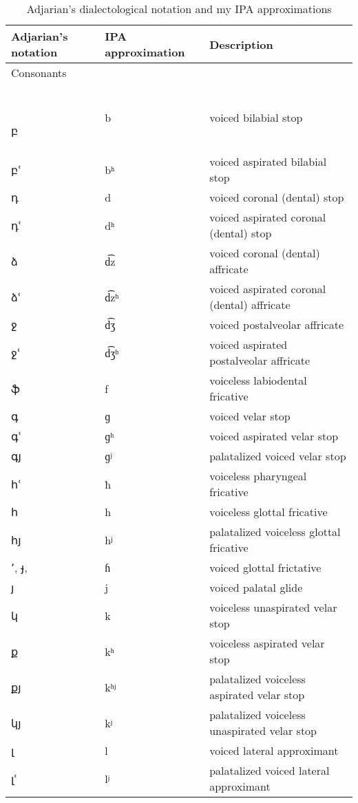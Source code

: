\begin{center}
	\begin{longtable}{|lll|}

		\caption{Adjarian's  dialectological notation and my IPA approximations } \label{tab:adjIPA} \\ \hline
		\hline Adjarian's notation & IPA approximation & Description \\
		\hline 
		\multicolumn{3}{|l|}{Consonants}					\\\

բ	& 	b 	& 	voiced bilabial stop	\\
		բՙ	& 	bʰ	& 	voiced aspirated bilabial stop	\\
		դ	& 	d 	& 	voiced coronal (dental) stop	\\
		դՙ	& 	dʰ	& 	voiced aspirated coronal (dental) stop	\\
		ձ	& 	d͡z 	& 	voiced coronal (dental) affricate	\\
		ձՙ	& 	d͡zʰ	& 	voiced aspirated coronal (dental) affricate	\\
		ջ	& 	d͡ʒ	& 	voiced postalveolar affricate	\\
		ջՙ	& 	d͡ʒʰ	& 	voiced aspirated postalveolar affricate	\\
		ֆ	& 	f	& 	voiceless labiodental fricative	\\
		գ	& 	ɡ 	& 	voiced velar stop	\\
		գՙ	& 	ɡʰ	& 	voiced aspirated velar stop	\\
		գյ	& 	ɡʲ	& 	palatalized voiced velar stop	\\
		հՙ	& 	ħ	& 	 voiceless pharyngeal fricative	\\
		հ	& 	h 	& 	voiceless glottal fricative	\\
		հյ	& 	hʲ	& 	palatalized voiceless glottal fricative	\\
		՚, յ̵,   \armeniang{ֈ}	& 	ɦ	& 	voiced glottal frictative	\\
		յ	& 	j	& 	voiced palatal glide	\\
		կ	& 	k 	& 	voiceless unaspirated velar stop	\\
		ք	& 	kʰ	& 	voiceless aspirated velar stop	\\
		քյ	& 	kʰʲ	& 	palatalized voiceless aspirated velar stop	\\
		կյ	& 	kʲ	& 	palatalized voiceless unaspirated velar stop	\\
		լ	& 	l	& 	voiced lateral approximant	\\
		լՙ	& 	lʲ	& 	palatalized voiced lateral approximant	\\

\end{longtable}
\end{center}
